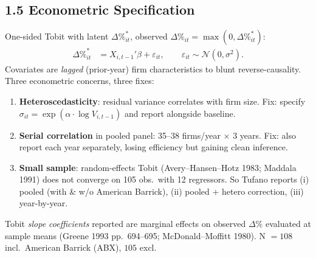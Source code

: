 \documentclass[11pt]{article}
\newcommand{\dP}{\Delta\%}
\begin{document}
\subsection*{1.5 Econometric Specification}
One-sided Tobit with latent $\dP^*_{it}$, observed $\dP_{it} = \max(0, \dP^*_{it})$:
\begin{align*}
\dP^*_{it} &= X_{i,t-1}'\beta + \varepsilon_{it},\qquad \varepsilon_{it}\sim\mathcal{N}(0,\sigma^2).
\end{align*}
Covariates are \emph{lagged} (prior-year) firm characteristics to blunt reverse-causality. Three econometric concerns, three fixes:
\begin{enumerate}
\item \textbf{Heteroscedasticity}: residual variance correlates with firm size. Fix: specify $\sigma_{it} = \exp(\alpha \cdot \log V_{i,t-1})$ and report alongside baseline.
\item \textbf{Serial correlation} in pooled panel: 35--38 firms/year $\times$ 3 years. Fix: also report each year separately, losing efficiency but gaining clean inference.
\item \textbf{Small sample}: random-effects Tobit (Avery--Hansen--Hotz 1983; Maddala 1991) does not converge on 105 obs.\ with 12 regressors. So Tufano reports (i) pooled (with \& w/o American Barrick), (ii) pooled $+$ hetero correction, (iii) year-by-year.
\end{enumerate}
Tobit \emph{slope coefficients} reported are marginal effects on observed $\dP$ evaluated at sample means (Greene 1993 pp.\ 694--695; McDonald--Moffitt 1980). N $= 108$ incl.\ American Barrick (ABX), $105$ excl.
\end{document}
